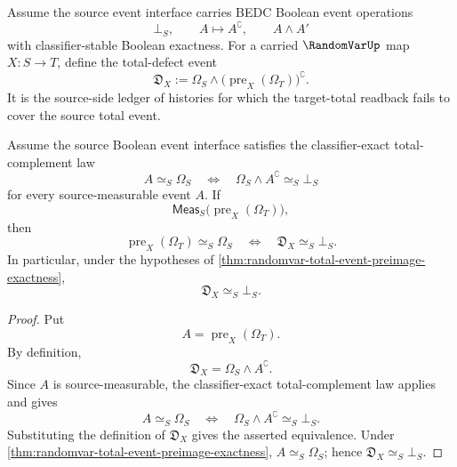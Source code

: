 \begin{definition}
\label{def:randomvar-total-defect-event}
Assume the source event interface carries BEDC Boolean event operations
$$
\bot_S,
\qquad
A\mapsto A^{\complement},
\qquad
A\wedge A'
$$
with classifier-stable Boolean exactness. For a carried $\RandomVarUp$ map $X:S\to T$, define the total-defect event
$$
\mathfrak D_X
:=
\Omega_S\wedge\bigl(\operatorname{pre}_X(\Omega_T)\bigr)^{\complement}.
$$
It is the source-side ledger of histories for which the target-total readback fails to cover the source total event.
\end{definition}

\begin{theorem}
\label{thm:randomvar-total-event-exactness-vanishing-total-defect}
Assume the source Boolean event interface satisfies the classifier-exact total-complement law
$$
A\simeq_S\Omega_S
\quad\Longleftrightarrow\quad
\Omega_S\wedge A^{\complement}\simeq_S\bot_S
$$
for every source-measurable event $A$. If
$$
\mathsf{Meas}_S\bigl(\operatorname{pre}_X(\Omega_T)\bigr),
$$
then
$$
\operatorname{pre}_X(\Omega_T)\simeq_S\Omega_S
\quad\Longleftrightarrow\quad
\mathfrak D_X\simeq_S\bot_S.
$$
In particular, under the hypotheses of \autoref{thm:randomvar-total-event-preimage-exactness},
$$
\mathfrak D_X\simeq_S\bot_S.
$$
\end{theorem}
\begin{proof}
Put
$$
A=\operatorname{pre}_X(\Omega_T).
$$
By definition,
$$
\mathfrak D_X=\Omega_S\wedge A^{\complement}.
$$
Since $A$ is source-measurable, the classifier-exact total-complement law applies and gives
$$
A\simeq_S\Omega_S
\quad\Longleftrightarrow\quad
\Omega_S\wedge A^{\complement}\simeq_S\bot_S.
$$
Substituting the definition of $\mathfrak D_X$ gives the asserted equivalence. Under \autoref{thm:randomvar-total-event-preimage-exactness}, $A\simeq_S\Omega_S$; hence $\mathfrak D_X\simeq_S\bot_S$.
\end{proof}

